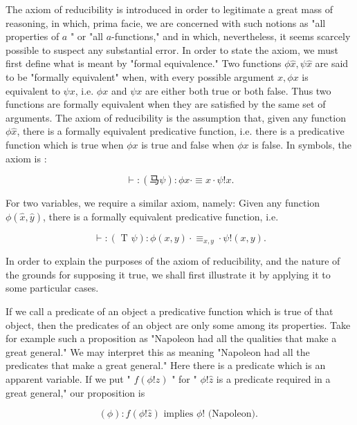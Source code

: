 \documentclass[10pt]{article}
\begin{document}
The axiom of reducibility is introduced in order to legitimate a great mass of reasoning, in which, prima facie, we are concerned with such notions as "all properties of $a$ " or "all $a$-functions," and in which, nevertheless, it seems scarcely possible to suspect any substantial error. In order to state the axiom, we must first define what is meant by "formal equivalence." Two functions $\phi \hat{x}, \psi \hat{x}$ are said to be "formally equivalent" when, with every possible argument $x, \phi x$ is equivalent to $\psi x$, i.e. $\phi x$ and $\psi x$ are either both true or both false. Thus two functions are formally equivalent when they are satisfied by the same set of arguments. The axiom of reducibility is the assumption that, given any function $\phi \hat{x}$, there is a formally equivalent predicative function, i.e. there is a predicative function which is true when $\phi x$ is true and false when $\phi x$ is false. In symbols, the axiom is :

$$
\vdash:(马 \psi): \phi x \cdot \equiv x \cdot \psi!x .
$$

For two variables, we require a similar axiom, namely: Given any function $\phi(\hat{x}, \hat{y})$, there is a formally equivalent predicative function, i.e.

$$
\vdash:(\text { T } \psi): \phi(x, y) \cdot \equiv_{x, y} \cdot \psi!(x, y) .
$$

In order to explain the purposes of the axiom of reducibility, and the nature of the grounds for supposing it true, we shall first illustrate it by applying it to some particular cases.

If we call a predicate of an object a predicative function which is true of that object, then the predicates of an object are only some among its properties. Take for example such a proposition as "Napoleon had all the qualities that make a great general." We may interpret this as meaning "Napoleon had all the predicates that make a great general." Here there is a predicate which is an apparent variable. If we put " $f(\phi!\hat{z})$ " for " $\phi!\hat{z}$ is a predicate required in a great general," our proposition is

$$
(\phi): f(\phi!\hat{z}) \text { implies } \phi!\text { (Napoleon). }
$$
\end{document}
